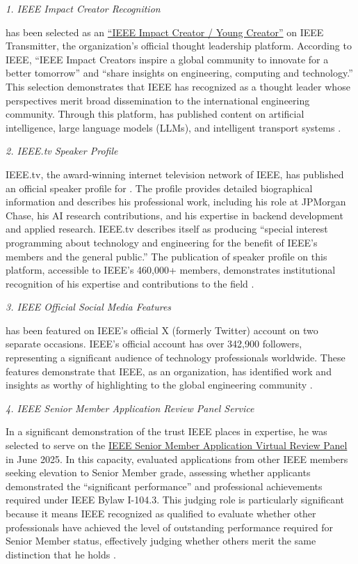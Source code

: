 \textit{1. IEEE Impact Creator Recognition}

\dr has been selected as an \underline{``IEEE Impact Creator / Young Creator''} on IEEE Transmitter, the organization's official thought leadership platform. According to IEEE, ``IEEE Impact Creators inspire a global community to innovate for a better tomorrow'' and ``share insights on engineering, computing and technology.'' This selection demonstrates that IEEE has recognized \dr as a thought leader whose perspectives merit broad dissemination to the international engineering community. Through this platform, \dr has published content on artificial intelligence, large language models (LLMs), and intelligent transport systems \cite{PM2}.

\textit{2. IEEE.tv Speaker Profile}

IEEE.tv, the award-winning internet television network of IEEE, has published an official speaker profile for \dr. The profile provides detailed biographical information and describes his professional work, including his role at JPMorgan Chase, his AI research contributions, and his expertise in backend development and applied research. IEEE.tv describes itself as producing ``special interest programming about technology and engineering for the benefit of IEEE's members and the general public.'' The publication of \drs speaker profile on this platform, accessible to IEEE's 460,000+ members, demonstrates institutional recognition of his expertise and contributions to the field \cite{PM3}.

\textit{3. IEEE Official Social Media Features}

\dr has been featured on IEEE's official X (formerly Twitter) account on two separate occasions. IEEE's official account has over 342,900 followers, representing a significant audience of technology professionals worldwide. These features demonstrate that IEEE, as an organization, has identified \drs work and insights as worthy of highlighting to the global engineering community \cite{PM4}.

\textit{4. IEEE Senior Member Application Review Panel Service}

In a significant demonstration of the trust IEEE places in \drs expertise, he was selected to serve on the \underline{IEEE Senior Member Application Virtual Review Panel} in June 2025. In this capacity, \dr evaluated applications from other IEEE members seeking elevation to Senior Member grade, assessing whether applicants demonstrated the ``significant performance'' and professional achievements required under IEEE Bylaw I-104.3. This judging role is particularly significant because it means IEEE recognized \dr as qualified to evaluate whether other professionals have achieved the level of outstanding performance required for Senior Member status, effectively judging whether others merit the same distinction that he holds \cite{JR11, JR12, JR13}.

